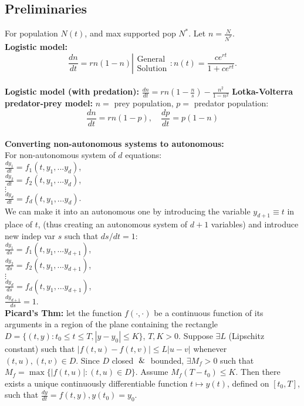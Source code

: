\documentclass[10pt,a4paper]{article}
\newcommand{\GS}[1]{{
    \left|\begin{smallmatrix}
        \text{General} \\
        \text{Solution}
    \end{smallmatrix}:#1\right. }}
\begin{document}
\setlength{\abovedisplayskip}{0pt}
\setlength{\belowdisplayskip}{0pt}
\setlength{\abovedisplayshortskip}{0pt}
\setlength{\belowdisplayshortskip}{0pt} 

\begin{multicols*}{2}

\section{Preliminaries}
For population $N(t)$, and max supported pop $N^*$. Let $n = \frac{N}{N^*}$.\\
\textbf{Logistic model:} \[\frac{dn}{dt} = rn(1-n) \GS{ n(t) = \frac{ce^{rt}}{1 + ce^{rt}}}.\]\\
\textbf{Logistic model (with predation):} $\frac{dn}{dt} = rn(1 - \frac{n}{s}) - \frac{n^2}{1 - n^2}$
\textbf{Lotka-Volterra predator-prey model:} $n =$ prey population, $p =$ predator population:\\
\[\frac{dn}{dt} = rn(1 - p), \quad \frac{dp}{dt} = p(1 - n)\]\\
\textbf{Converting non-autonomous systems to autonomous:}\\
For non-autonomous system of $d$ equations:\\
$\frac{dy_1}{dt} = f_1(t, y_1, ... y_d)$, \\
$\frac{dy_2}{dt} = f_2(t, y_1, ... y_d)$, \\
$\vdots$\\
$\frac{dy_d}{dt} = f_d(t, y_1, ... y_d)$. \\
We can make it into an autonomous one by introducing the variable $y_{d+1} \equiv t$ in place of $t$, (thus creating an autonomous system of $d + 1$ variables) and introduce new indep var $s$ such that $ds/dt = 1$:\\
$\frac{dy_1}{ds} = f_1(t, y_1, ... y_{d+1})$, \\
$\frac{dy_2}{ds} = f_2(t, y_1, ... y_{d+1})$, \\
$\vdots$\\
$\frac{dy_d}{ds} = f_d(t, y_1, ... y_{d+1})$, \\
$\frac{dy_{d + 1}}{ds} = 1$. \\
\textbf{Picard's Thm:} let the function $f (\cdot, \cdot)$ be a continuous function of its arguments in a region of the plane containing the rectangle $D = \{(t,y) : t_0 \leq t \leq T, |y - y_0| \leq K\}$, $T,K > 0$. Suppose $\exists L$ (Lipschitz constant) such that $|f(t,u) - f(t,v)| \leq L |u - v|$ whenever $(t,u), (t,v) \in D$. Since $D$ closed $\And$ bounded, $\exists M_f > 0$ such that $M_f = \max\{|f(t,u)|:(t,u) \in D\}$. Assume $M_f(T - t_0) \leq K$. Then there exists a unique continuously differentiable function $t \mapsto y(t)$, defined on $[t_0, T]$, such that $\frac{dy}{dt} = f(t,y), y(t_0) = y_0$.


\end{multicols*}
\end{document}
